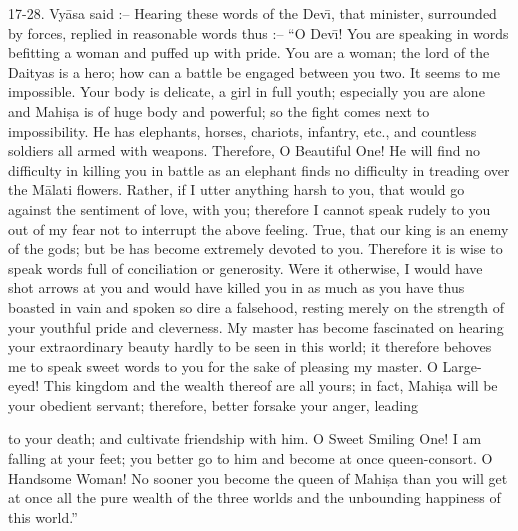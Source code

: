 17-28. Vy\=asa said :-- Hearing these words of the Dev\={\i}, that minister, surrounded by forces, replied in reasonable words thus :-- ``O Dev\={\i}! You are speaking in words befitting a woman and puffed up with pride. You are a woman; the lord of the Daityas is a hero; how can a battle be engaged between you two. It seems to me impossible. Your body is delicate, a girl in full youth; especially you are alone and Mahi\d{s}a is of huge body and powerful; so the fight comes next to impossibility. He has elephants, horses, chariots, infantry, etc., and countless soldiers all armed with weapons. Therefore, O Beautiful One! He will find no difficulty in killing you in battle as an elephant finds no difficulty in treading over the M\=alati flowers. Rather, if I utter anything harsh to you, that would go against the sentiment of love, with you; therefore I cannot speak rudely to you out of my fear not to interrupt the above feeling. True, that our king is an enemy of the gods; but be has become extremely devoted to you. Therefore it is wise to speak words full of conciliation or generosity. Were it otherwise, I would have shot arrows at you and would have killed you in as much as you have thus boasted in vain and spoken so dire a falsehood, resting merely on the strength of your youthful pride and cleverness. My master has become fascinated on hearing your extraordinary beauty hardly to be seen in this world; it therefore behoves me to speak sweet words to you for the sake of pleasing my master. O Large-eyed! This kingdom and the wealth thereof are all yours; in fact, Mahi\d{s}a will be your obedient servant; therefore, better forsake your anger, leading

to your death; and cultivate friendship with him. O Sweet Smiling One! I am falling at your feet; you better go to him and become at once queen-consort. O Handsome Woman! No sooner you become the queen of Mahi\d{s}a than you will get at once all the pure wealth of the three worlds and the unbounding happiness of this world.''

